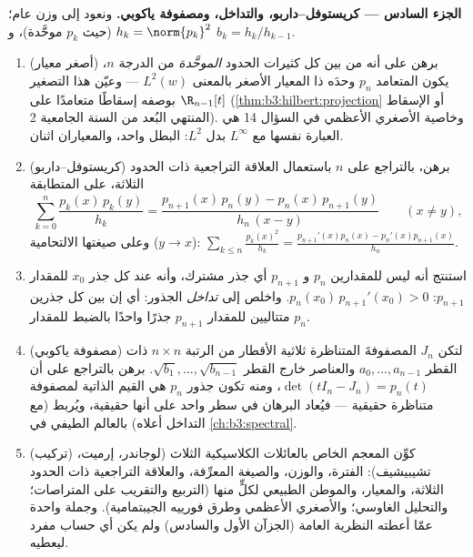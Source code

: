 \begin{problem}
\medskip
\noindent\textbf{الجزء السادس --- كريستوفل--داربو، والتداخل،
ومصفوفة ياكوبي.} ونعود إلى وزن عام؛ $h_k = \norm{p_k}^2$ (حيث $p_k$
موحَّدة)، و $b_k = h_k/h_{k-1}$.
\begin{enumerate}[resume]
  \item (أصغر معيار) برهن على أنه من بين كل كثيرات الحدود
        \emph{الموحَّدة} من الدرجة $n$، يكون المتعامد $p_n$
        وحدَه ذا المعيار الأصغر بالمعنى $L^2(w)$ --- وعيّن
        هذا التصغير بوصفه إسقاطًا متعامدًا على $\R_{n-1}[t]$
        (\cref{thm:b3:hilbert:projection} أو الإسقاط المنتهي البُعد من السنة
        الجامعية 2). وخاصية الأصغري الأعظمي في
        السؤال 14 هي العبارة نفسها مع $L^\infty$ بدل $L^2$:
        البطل واحد، والمعياران اثنان.
  \item (كريستوفل--داربو) برهن، بالتراجع على $n$ باستعمال
        العلاقة التراجعية ذات الحدود الثلاثة، على المتطابقة
        \[
        \sum_{k=0}^{n}\frac{p_k(x)\,p_k(y)}{h_k}
        = \frac{p_{n+1}(x)\,p_n(y) -
        p_n(x)\,p_{n+1}(y)}{h_n\,(x - y)}
        \qquad (x \neq y),
        \]
        وعلى صيغتها الالتحامية ($y \to x$):
        $\sum_{k\leq n}\frac{p_k(x)^2}{h_k} =
        \frac{p_{n+1}'(x)p_n(x) - p_n'(x)p_{n+1}(x)}{h_n}$.
  \item استنتج أنه ليس للمقدارين $p_n$ و $p_{n+1}$ أي جذر مشترك،
        وأنه عند كل جذر $x_0$ للمقدار $p_{n+1}$:
        $p_n(x_0)\,p_{n+1}'(x_0) > 0$. واخلص إلى \emph{تداخل} الجذور: أي إن بين كل
        جذرين متتاليين للمقدار $p_{n+1}$ جذرًا واحدًا بالضبط
        للمقدار $p_n$.
  \item (مصفوفة ياكوبي) لتكن $J_n$ المصفوفةَ المتناظرة ثلاثية
        الأقطار من الرتبة $n\times n$ ذات القطر $a_0,
        \dots, a_{n-1}$
        والعناصر خارج القطر $\sqrt{b_1},
        \dots, \sqrt{b_{n-1}}$. برهن بالتراجع على أن
        $\det(tI_n - J_n) = p_n(t)$، ومنه تكون جذور $p_n$ هي القيم الذاتية
        لمصفوفة متناظرة حقيقية --- فيُعاد البرهان في سطر واحد
        على أنها حقيقية، ويُربط (مع التداخل أعلاه)  بالعالم الطيفي في \cref{ch:b3:spectral}.
  \item (تركيب) كوِّن المعجم الخاص بالعائلات الكلاسيكية
        الثلاث (لوجاندر، إرميت، تشيبيشيف): الفترة، والوزن،
        والصيغة المعرِّفة، والعلاقة التراجعية ذات الحدود
        الثلاثة، والمعيار، والموطن الطبيعي لكلٍّ منها (التربيع
        والتقريب على المتراصات؛ والتحليل الغاوسي؛ والأصغري
        الأعظمي وطرق فورييه الجيبتمامية). وجملة واحدة عمّا
        أعطته النظرية العامة (الجزآن الأول والسادس) ولم يكن
        أي حساب مفرد ليعطيه.
\end{enumerate}


\end{problem}
